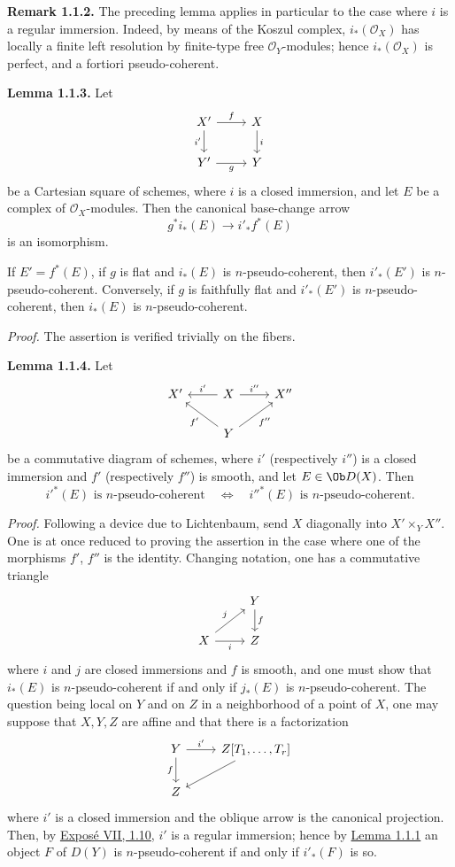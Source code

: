 \textbf{Remark 1.1.2.} The preceding lemma applies in particular to the case where \(i\) is a regular immersion. Indeed, by means of the Koszul complex, \(i_*(\mathcal O_X)\) has locally a finite left resolution by finite-type free \(\mathcal O_Y\)-modules; hence \(i_*(\mathcal O_X)\) is perfect, and a fortiori pseudo-coherent.

\textbf{Lemma 1.1.3.} Let
\[
\begin{tikzcd}
X' \arrow[r,"f"] \arrow[d,"i'"'] & X \arrow[d,"i"]\\
Y' \arrow[r,"g"'] & Y
\end{tikzcd}
\]
be a Cartesian square of schemes, where \(i\) is a closed immersion, and let \(E\) be a complex of \(\mathcal O_X\)-modules. Then the canonical base-change arrow
\[
  g^*i_*(E)\longrightarrow i'_*f^*(E)
\]
is an isomorphism.

If \(E'=f^*(E)\), if \(g\) is flat and \(i_*(E)\) is \(n\)-pseudo-coherent, then \(i'_*(E')\) is \(n\)-pseudo-coherent. Conversely, if \(g\) is faithfully flat and \(i'_*(E')\) is \(n\)-pseudo-coherent, then \(i_*(E)\) is \(n\)-pseudo-coherent.

\emph{Proof.} The assertion is verified trivially on the fibers.

\textbf{Lemma 1.1.4.} Let
\[
\begin{tikzcd}
X' & X \arrow[l,"i'"'] \arrow[r,"i''"] & X''\\
& Y \arrow[ul,"f'"] \arrow[ur,"f''"'] &
\end{tikzcd}
\]
be a commutative diagram of schemes, where \(i'\) (respectively \(i''\)) is a closed immersion and \(f'\) (respectively \(f''\)) is smooth, and let \(E\in \Ob D(X)\). Then
\[
  i'^*(E)\text{ is }n\text{-pseudo-coherent}
  \quad\Longleftrightarrow\quad
  i''^*(E)\text{ is }n\text{-pseudo-coherent}.
\]

\emph{Proof.} Following a device due to Lichtenbaum, send \(X\) diagonally into \(X'\times_YX''\). One is at once reduced to proving the assertion in the case where one of the morphisms \(f'\), \(f''\) is the identity. Changing notation, one has a commutative triangle
\[
\begin{tikzcd}
& Y \arrow[d,"f"]\\
X \arrow[r,"i"'] \arrow[ur,"j"] & Z
\end{tikzcd}
\]
where \(i\) and \(j\) are closed immersions and \(f\) is smooth, and one must show that \(i_*(E)\) is \(n\)-pseudo-coherent if and only if \(j_*(E)\) is \(n\)-pseudo-coherent. The question being local on \(Y\) and on \(Z\) in a neighborhood of a point of \(X\), one may suppose that \(X,Y,Z\) are affine and that there is a factorization
\[
\begin{tikzcd}
Y \arrow[r,"i'"] \arrow[d,"f"'] & Z[T_1,\ldots,T_r]\arrow[dl]\\
Z&
\end{tikzcd}
\]
where \(i'\) is a closed immersion and the oblique arrow is the canonical projection. Then, by \hyperlink{sga6.e07.prop.1-10}{Exposé VII, 1.10}, \(i'\) is a regular immersion; hence by \hyperlink{sga6.e03.lem.1-1-1}{Lemma 1.1.1} an object \(F\) of \(D(Y)\) is \(n\)-pseudo-coherent if and only if \(i'_*(F)\) is so.

